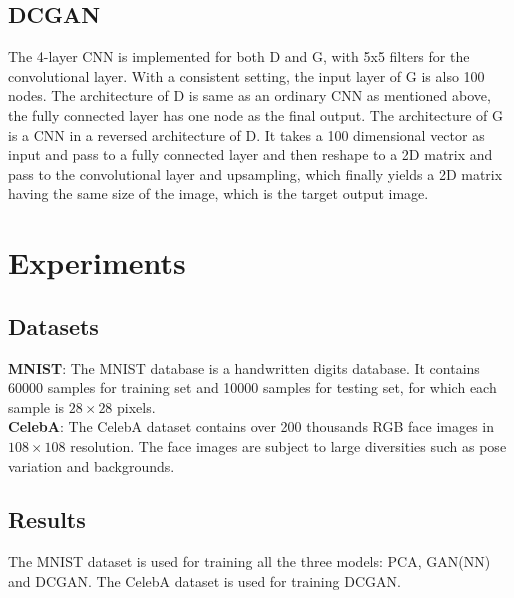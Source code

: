 \documentclass[10pt,twocolumn,letterpaper]{article}
\begin{document}
\subsection{DCGAN}
The 4-layer CNN is implemented for both D and G, with 5x5 filters for the convolutional layer. With a consistent setting, the input layer of G is also 100 nodes. The architecture of D is same as an ordinary CNN as mentioned above, the fully connected layer has one node as the final output. The architecture of G is a CNN in a reversed architecture of D. It takes a 100 dimensional vector as input and pass to a fully connected layer and then reshape to a 2D matrix and pass to the convolutional layer and upsampling, which finally yields a 2D matrix having the same size of the image, which is the target output image.

\section{Experiments}
\subsection{Datasets}
\textbf{MNIST}: The MNIST database is a handwritten digits database. It contains 60000 samples for training set and 10000 samples for testing set, for which each sample is $28\times28$ pixels.\\
 
\textbf{CelebA}: The CelebA dataset contains over 200 thousands RGB face images in $108\times108$ resolution. The face images are subject to large diversities such as pose variation and backgrounds.
\subsection{Results}
The MNIST dataset is used for training all the three models: PCA, GAN(NN) and DCGAN. The CelebA dataset is used for training DCGAN.\\
\end{document}
